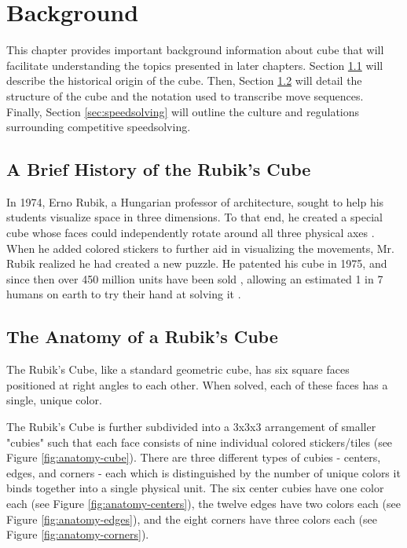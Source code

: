 \chapter{Background}
\label{Chapter2}

This chapter provides important background information about cube that
will facilitate understanding the topics presented in later chapters.
Section \ref{sec:rubiks-history} will describe the historical origin of
the cube. Then, Section \ref{sec:rubiks-anatomy} will detail the
structure of the cube and the notation used to transcribe move
sequences. Finally, Section \ref{sec:speedsolving} will outline the
culture and regulations surrounding competitive speedsolving.


\section{A Brief History of the Rubik's Cube}
\label{sec:rubiks-history}

In 1974, Erno Rubik, a Hungarian professor of architecture, sought to
help his students visualize space in three dimensions. To that end, he
created a special cube whose faces could independently rotate around
all three physical axes \cite{rubik-motivation}. When he added colored
stickers to further aid in visualizing the movements, Mr. Rubik
realized he had created a new puzzle. He patented his cube in 1975,
\cite{rubik-patent} and since then over 450 million units have been
sold \cite{forbes-rubik-merger}, allowing an estimated 1 in 7 humans on
earth to try their hand at solving it \cite{rubik-population-reached}.


\section{The Anatomy of a Rubik's Cube}
\label{sec:rubiks-anatomy}

The Rubik's Cube, like a standard geometric cube, has six square faces
positioned at right angles to each other. When solved, each of these
faces has a single, unique color.

The Rubik's Cube is further subdivided into a 3x3x3 arrangement of
smaller "cubies" such that each face consists of nine individual
colored stickers/tiles (see Figure \ref{fig:anatomy-cube}). There are
three different types of cubies - centers, edges, and corners - each
which is distinguished by the number of unique colors it binds together
into a single physical unit. The six center cubies have one color each
(see Figure \ref{fig:anatomy-centers}), the twelve edges have two
colors each (see Figure \ref{fig:anatomy-edges}), and the eight corners
have three colors each (see Figure \ref{fig:anatomy-corners}).

